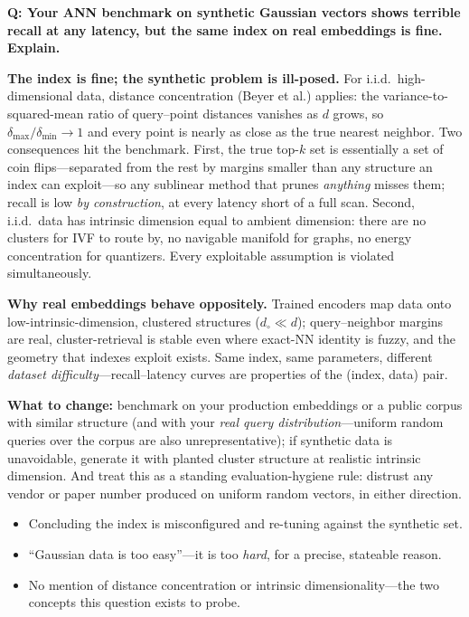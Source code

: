 \begin{interviewq}
\textbf{Q: Your ANN benchmark on synthetic Gaussian vectors shows terrible recall at any latency, but the same index on real embeddings is fine. Explain.}

 \quad {} \quad \badgefreq{\freqlow}

\stronganswer

\textbf{The index is fine; the synthetic problem is ill-posed.} For i.i.d.\ high-dimensional data, distance concentration (Beyer et al.) applies: the variance-to-squared-mean ratio of query--point distances vanishes as $d$ grows, so $\delta_{\max}/\delta_{\min} \to 1$ and every point is nearly as close as the true nearest neighbor. Two consequences hit the benchmark. First, the true top-$k$ set is essentially a set of coin flips---separated from the rest by margins smaller than any structure an index can exploit---so any sublinear method that prunes \emph{anything} misses them; recall is low \emph{by construction}, at every latency short of a full scan. Second, i.i.d.\ data has intrinsic dimension equal to ambient dimension: there are no clusters for IVF to route by, no navigable manifold for graphs, no energy concentration for quantizers. Every exploitable assumption is violated simultaneously.

\textbf{Why real embeddings behave oppositely.} Trained encoders map data onto low-intrinsic-dimension, clustered structures ($d_\circ \ll d$); query--neighbor margins are real, cluster-retrieval is stable even where exact-NN identity is fuzzy, and the geometry that indexes exploit exists. Same index, same parameters, different \emph{dataset difficulty}---recall--latency curves are properties of the (index, data) pair.

\textbf{What to change:} benchmark on your production embeddings or a public corpus with similar structure (and with your \emph{real query distribution}---uniform random queries over the corpus are also unrepresentative); if synthetic data is unavoidable, generate it with planted cluster structure at realistic intrinsic dimension. And treat this as a standing evaluation-hygiene rule: distrust any vendor or paper number produced on uniform random vectors, in either direction.

\redflags
\begin{itemize}
    \item Concluding the index is misconfigured and re-tuning against the synthetic set.
    \item ``Gaussian data is too easy''---it is too \emph{hard}, for a precise, stateable reason.
    \item No mention of distance concentration or intrinsic dimensionality---the two concepts this question exists to probe.
\end{itemize}


\end{interviewq}
